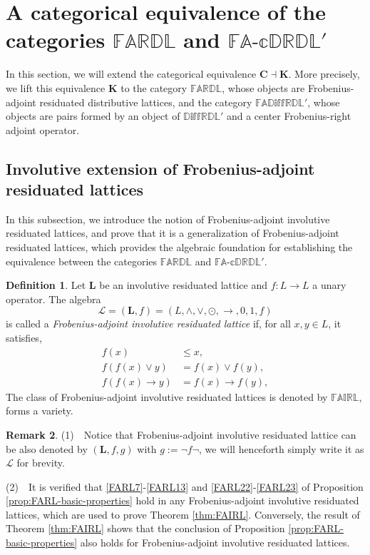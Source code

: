 \documentclass[final,12pt,times]{elsarticle}
\theoremstyle{plain}
\theoremstyle{definition}
\newtheorem{definition}{Definition}[section]
\newtheorem{remark}[definition]{Remark}
\theoremstyle{break}
\newcommand{\FAIRL}{\mathbb{FAIRL}}
\newcommand{\FARDL}{\mathbb{FARDL}}
\newcommand{\CFAD}{\mathbb{FA\text{-}cDRDL}}
\begin{document}
\section{A categorical equivalence of the categories $\FARDL$ and $\CFAD'$}\label{section4.}

In this section, we will extend the categorical equivalence $\mathbf{C} \dashv \mathbf{K}$. More precisely, we lift this equivalence $\mathbf{K}$ to the category $\mathbb{FARDL}$, whose objects are Frobenius-adjoint residuated distributive lattices, and the category $\mathbb{FAD\text{iff}RDL'}$, whose objects are pairs formed by an object of $\mathbb{D\text{iff}RDL'}$ and a center Frobenius-right adjoint operator.

\subsection{Involutive extension of Frobenius-adjoint residuated lattices}\label{subsection:INV-FARL}

In this subsection, we introduce the notion of Frobenius-adjoint involutive residuated lattices, and prove that it is a generalization of Frobenius-adjoint residuated lattices, which provides the algebraic foundation for establishing the equivalence between the categories $\FARDL$ and $\CFAD'$.

\begin{definition}\label{def:FAIRL}
Let
$\mathbf{L}$ be an involutive residuated lattice and
$f:L\to L$ a unary operator.  The algebra\\
\[
\mathscr{L}=(\mathbf{L},f)
  =(L,\wedge,\vee,\odot,\to,0,1,f)
\]
is called a \emph{Frobenius-adjoint involutive residuated lattice} if, for all
$x,y\in L$, it satisfies, 
\begin{align}
 f(x)&\leq x,
  \tag{FARL1}\label{FARL1}\\
 f(f(x)\vee y)&=f(x)\vee f(y),
   \tag{FARL14}\label{FARL14}\\
 f(f(x)\to y)&=f(x)\to f(y),
   \tag{FARL17}\label{FARL17}
\end{align}
The class of Frobenius-adjoint involutive residuated lattices is denoted by
$\FAIRL$, forms a variety.
\end{definition}

\begin{remark}\label{rem:FAIRL-basic-properties}
(1)~~Notice that Frobenius-adjoint involutive residuated lattice can be also denoted by $(\mathbf{L},f,g)$ with $g:=\neg f\neg$, we will henceforth simply write it as $\mathscr{L}$ for brevity.

(2)~~It is verified that \ref{FARL7}-\ref{FARL13} and \ref{FARL22}-\ref{FARL23} of Proposition \ref{prop:FARL-basic-properties} hold in any Frobenius-adjoint involutive residuated lattices, which are used to prove Theorem \ref{thm:FAIRL}. Conversely, the result of Theorem \ref{thm:FAIRL} shows that the conclusion of Proposition \ref{prop:FARL-basic-properties} also holds for Frobenius-adjoint involutive residuated lattices.
\end{remark}
\end{document}
